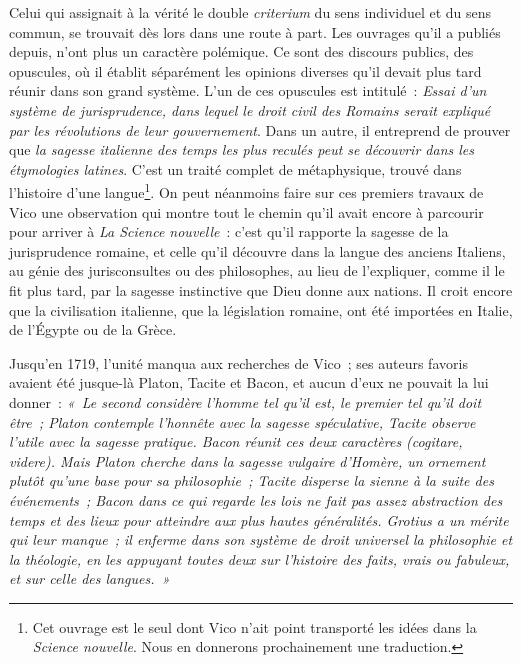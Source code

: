 \documentclass[french,twoside]{book} %
\begin{document}
Celui qui assignait à la vérité le double {\itshape criterium} du sens individuel et du sens commun, se trouvait dès lors dans une route à part. Les ouvrages qu’il a publiés depuis, n’ont plus un caractère polémique. Ce sont des discours publics, des opuscules, où il établit séparément les opinions diverses qu’il devait plus tard réunir dans son grand système. L’un de ces opuscules est intitulé : {\itshape Essai d’un système de jurisprudence, dans lequel le droit civil des Romains serait expliqué par les révolutions de leur gouvernement}. Dans un autre, il entreprend de prouver que {\itshape la sagesse italienne des temps les plus reculés peut se découvrir dans les étymologies latines}. C’est un traité complet de métaphysique, trouvé dans l’histoire d’une langue\footnote{Cet ouvrage est le seul dont Vico n’ait point transporté les idées dans la {\itshape Science nouvelle}. Nous en donnerons prochainement une traduction.}. On peut néanmoins faire sur ces premiers travaux de Vico une observation qui montre tout le chemin qu’il avait encore à parcourir pour arriver à {\itshape La Science nouvelle} : c’est qu’il rapporte la sagesse de la jurisprudence romaine,  et celle qu’il découvre dans la langue des anciens Italiens, au génie des jurisconsultes ou des philosophes, au lieu de l’expliquer, comme il le fit plus tard, par la sagesse instinctive que Dieu donne aux nations. Il croit encore que la civilisation italienne, que la législation romaine, ont été importées en Italie, de l’Égypte ou de la Grèce.\par
Jusqu’en 1719, l’unité manqua aux recherches de Vico ; ses auteurs favoris avaient été jusque-là Platon, Tacite et Bacon, et aucun d’eux ne pouvait la lui donner : \emph{« Le second considère l’homme tel qu’il est, le premier tel qu’il doit être ; Platon contemple l’honnête avec la sagesse spéculative, Tacite observe l’utile avec la sagesse pratique. Bacon réunit ces deux caractères ({\itshape cogitare, videre}). Mais Platon cherche dans la sagesse vulgaire d’Homère, un ornement plutôt qu’une base pour sa philosophie ; Tacite disperse la sienne à la suite des événements ; Bacon dans ce qui regarde les lois ne fait pas assez abstraction des temps et des lieux pour atteindre aux plus hautes généralités. Grotius a un mérite qui leur manque ; il enferme dans son système de droit universel la philosophie et la théologie, en les appuyant toutes deux sur l’histoire des faits, vrais ou fabuleux, et sur celle des langues. »}\par
\end{document}
